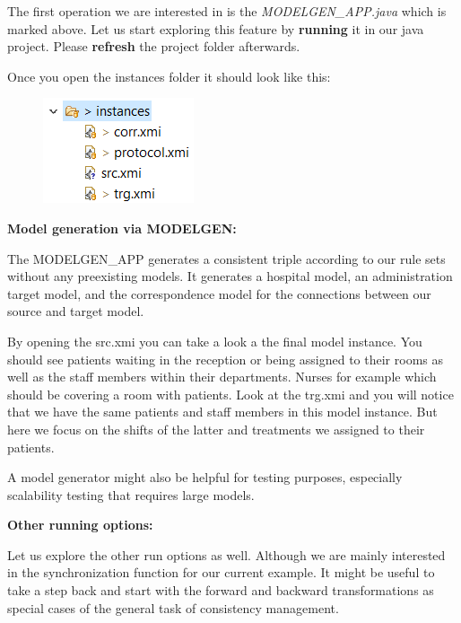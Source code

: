 \clearpage

The first operation we are interested in is the \textit{\textsf{MODELGEN\_APP.java}} which is marked above. Let us start exploring this feature by \textbf{running} it in our java project. Please \textbf{refresh} the project folder afterwards.\newline

Once you open the \textsf{instances} folder it should look like this:

\begin{figure}[h]
    \centering
    \includegraphics[scale=0.85 ]{pictures/instances.png}
    \caption{}
    \label{setDefaultNumber}
\end{figure}

\textbf{Model generation via MODELGEN:}

The \textsf{MODELGEN\_APP} generates a consistent triple according to our rule sets without any preexisting models. It generates a hospital model, an administration target model, and the correspondence model for the connections between our source and target model.\newline

By opening the \textsf{src.xmi} you can take a look a the final model instance. You should see patients waiting in the reception or being assigned to their rooms as well as the staff members within their departments. Nurses for example which should be covering a room with patients. Look at the \textsf{trg.xmi} and you will notice that we have the same patients and staff members in this model instance. But here we focus on the shifts of the latter and treatments we assigned to their patients.

A model generator might also be helpful for testing purposes, especially scalability testing that requires large models. \newline

\textbf{Other running options:}

Let us explore the other run options as well. Although we are mainly interested in the synchronization function for our current example. It might be useful to take a step back and start with the forward and backward transformations as special cases of the general task of consistency management.\newline

